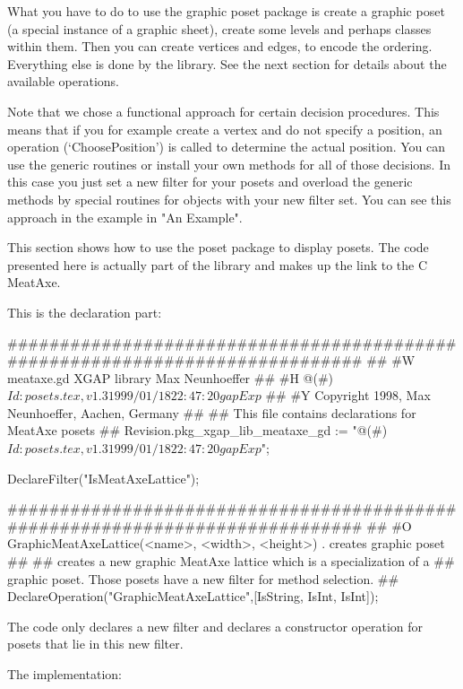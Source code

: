 What you have to do to use the graphic poset package is create a graphic
poset (a special instance of a graphic sheet), create some levels and
perhaps classes within them. Then you can create vertices and edges, to
encode the ordering. Everything else is done by the library. See the next
section for details about the available operations.

Note that we chose a functional approach for certain decision
procedures. This means that if you for example create a vertex and do not
specify a position, an operation (`ChoosePosition') is called to determine
the actual position. You can use the generic routines or install your own
methods for all of those decisions. In this case you just set a new filter
for your posets and overload the generic methods by special routines for
objects with your new filter set. You can see this approach in the example
in "An Example".




This section shows how to use the poset package to display posets. The code
presented here is actually part of the {\XGAP} library and makes up the
link to the C MeatAxe.

This is the declaration part:

\beginexample
#############################################################################
##
#W  meataxe.gd                  XGAP library                  Max Neunhoeffer
##
#H  @(#)$Id: posets.tex,v 1.3 1999/01/18 22:47:20 gap Exp $
##
#Y  Copyright 1998,       Max Neunhoeffer,              Aachen,       Germany
##
##  This file contains declarations for MeatAxe posets
##
Revision.pkg_xgap_lib_meataxe_gd :=
    "@(#)$Id: posets.tex,v 1.3 1999/01/18 22:47:20 gap Exp $";

DeclareFilter("IsMeatAxeLattice");

#############################################################################
##
#O  GraphicMeatAxeLattice(<name>, <width>, <height>)  . creates graphic poset
##
##  creates a new graphic MeatAxe lattice which is a specialization of a
##  graphic poset. Those posets have a new filter for method selection.
##
DeclareOperation("GraphicMeatAxeLattice",[IsString, IsInt, IsInt]);
\endexample

The code only declares a new filter and declares a constructor operation
for posets that lie in this new filter.

The implementation:

